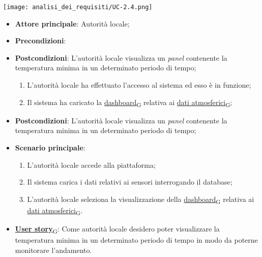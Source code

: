\begin{center}
	\texttt{[image: analisi\_dei\_requisiti/UC-2.4.png]}
\end{center}
\begin{itemize}
	\item \textbf{Attore principale}: Autorità locale;
	\item \textbf{Precondizioni}:  	\item \textbf{Postcondizioni}: L'autorità locale visualizza un \textit{panel} contenente la temperatura minima in un determinato periodo di tempo;
	      \begin{enumerate}
		      \item L'autorità locale ha effettuato l'accesso al sistema ed esso è in funzione;
		      \item Il sistema ha caricato la \href{https://7last.github.io/docs/rtb/documentazione-interna/glossario\#dashboard}{dashboard\textsubscript{G}} relativa ai \href{https://7last.github.io/docs/rtb/documentazione-interna/glossario\#dati-atmosferici}{dati atmosferici\textsubscript{G}};
	      \end{enumerate}
	\item \textbf{Postcondizioni}: L'autorità locale visualizza un \textit{panel} contenente la temperatura minima in un determinato periodo di tempo;
	\item \textbf{Scenario principale}:
	      \begin{enumerate}
		      \item L'autorità locale accede alla piattaforma;
		      \item Il sistema carica i dati relativi ai sensori interrogando il database;
		      \item L'autorità locale seleziona la visualizzazione della \href{https://7last.github.io/docs/rtb/documentazione-interna/glossario\#dashboard}{dashboard\textsubscript{G}} relativa ai \href{https://7last.github.io/docs/rtb/documentazione-interna/glossario\#dati-atmosferici}{dati atmosferici\textsubscript{G}}.
	      \end{enumerate}
	\item \href{https://7last.github.io/docs/rtb/documentazione-interna/glossario\#user-story}{\textbf{User story}\textsubscript{G}}: Come autorità locale desidero poter visualizzare la temperatura minima in un determinato periodo di tempo
	      in modo da poterne monitorare l'andamento.
\end{itemize}


